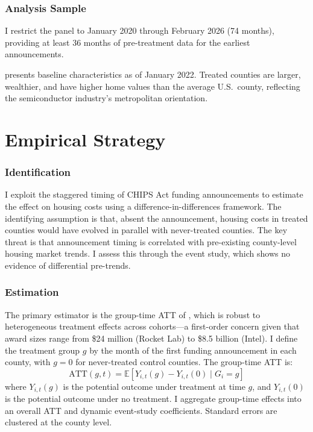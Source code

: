 \documentclass[12pt]{article}
\newcommand{\E}{\mathbb{E}}
\begin{document}
\subsubsection*{Analysis Sample} I restrict the panel to January 2020 through February 2026 (74 months), providing at least 36 months of pre-treatment data for the earliest announcements.



 presents baseline characteristics as of January 2022. Treated counties are larger, wealthier, and have higher home values than the average U.S.\ county, reflecting the semiconductor industry's metropolitan orientation.

\section{Empirical Strategy}
\label{sec:strategy}

\subsubsection*{Identification} I exploit the staggered timing of CHIPS Act funding announcements to estimate the effect on housing costs using a difference-in-differences framework. The identifying assumption is that, absent the announcement, housing costs in treated counties would have evolved in parallel with never-treated counties. The key threat is that announcement timing is correlated with pre-existing county-level housing market trends. I assess this through the event study, which shows no evidence of differential pre-trends.

\subsubsection*{Estimation} The primary estimator is the group-time ATT of \citet{callaway2021difference}, which is robust to heterogeneous treatment effects across cohorts---a first-order concern given that award sizes range from \$24 million (Rocket Lab) to \$8.5 billion (Intel). I define the treatment group $g$ by the month of the first funding announcement in each county, with $g = 0$ for never-treated control counties. The group-time ATT is:
\begin{equation}
\text{ATT}(g,t) = \E\left[Y_{i,t}(g) - Y_{i,t}(0) \mid G_i = g\right]
\end{equation}
where $Y_{i,t}(g)$ is the potential outcome under treatment at time $g$, and $Y_{i,t}(0)$ is the potential outcome under no treatment. I aggregate group-time effects into an overall ATT and dynamic event-study coefficients. Standard errors are clustered at the county level.
\end{document}
